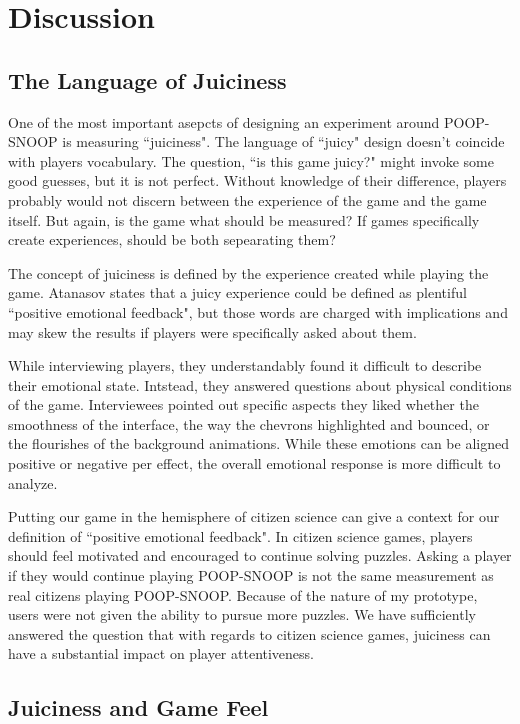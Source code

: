 \chapter{Discussion}

\section{The Language of Juiciness}

One of the most important asepcts of designing an experiment around POOP-SNOOP is measuring ``juiciness". The language of ``juicy" design doesn't coincide with players vocabulary. The question, ``is this game juicy?" might invoke some good guesses, but it is not perfect. Without knowledge of their difference, players probably would not discern between the experience of the game and the game itself. But again, is the game what should be measured? If games specifically create experiences, should be both sepearating them? 

The concept of juiciness is defined by the experience created while playing the game. Atanasov \cite{atanasov} states that a juicy experience could be defined as plentiful ``positive emotional feedback", but those words are charged with implications and may skew the results if players were specifically asked about them.

While interviewing players, they understandably found it difficult to describe their emotional state. Intstead, they answered questions about physical conditions of the game. Interviewees pointed out specific aspects they liked whether the smoothness of the interface, the way the chevrons highlighted and bounced, or the flourishes of the background animations. While these emotions can be aligned positive or negative per effect, the overall emotional response is more difficult to analyze.

Putting our game in the hemisphere of citizen science can give a context for our definition of ``positive emotional feedback". In citizen science games, players should feel motivated and encouraged to continue solving puzzles. Asking a player if they would continue playing POOP-SNOOP is not the same measurement as real citizens playing POOP-SNOOP. Because of the nature of my prototype, users were not given the ability to pursue more puzzles. We have sufficiently answered the question that with regards to citizen science games, juiciness can have a substantial impact on player attentiveness.

\section{Juiciness and Game Feel}

